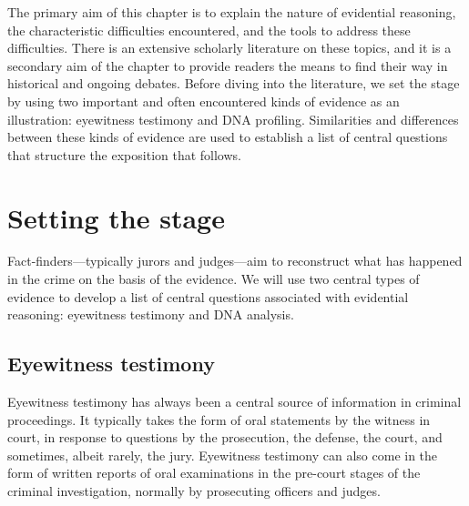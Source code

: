 \documentclass[10pt]{article}
\begin{document}
The primary aim of this chapter is to explain the nature of evidential reasoning, the characteristic difficulties encountered, and the tools to address these difficulties. There is an extensive scholarly literature on these topics, and it is a secondary aim of the chapter to provide readers the means to find their way in historical and ongoing debates. Before diving into the literature, we set the stage by using two important and often encountered kinds of evidence as an illustration: eyewitness testimony and DNA profiling. Similarities and differences between these kinds of evidence are used to establish a list of central questions that structure the exposition that follows.


\section{Setting the stage}


Fact-finders---typically jurors and judges---aim to reconstruct what has happened in the crime on the basis of the evidence. 
We will use two central types of evidence to develop a list of central questions associated with evidential reasoning: eyewitness testimony and DNA analysis.

\subsection{Eyewitness testimony}

Eyewitness testimony has always been a central source of information in criminal proceedings. It typically takes the form of oral statements by the witness in court, in response to questions by the prosecution, the defense, the court, and sometimes, albeit rarely, the jury. Eyewitness testimony can also come 
in the form of written reports of oral examinations in the pre-court stages of the criminal investigation, normally by prosecuting officers and judges. 
\end{document}
